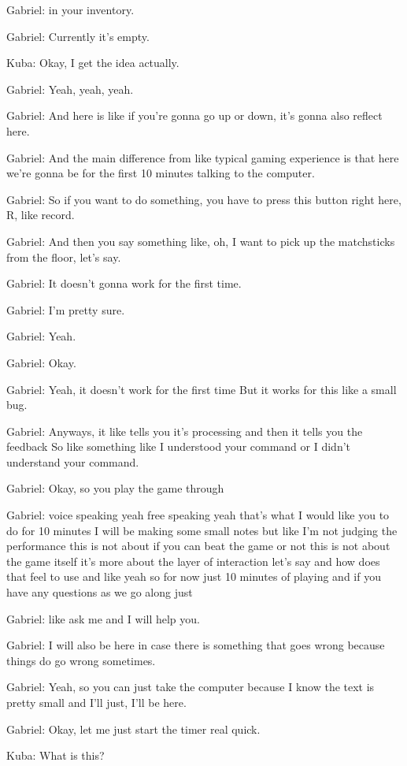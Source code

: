 Gabriel: in your inventory.

Gabriel: Currently it's empty.

Kuba: Okay, I get the idea actually.

Gabriel: Yeah, yeah, yeah.

Gabriel: And here is like if you're gonna go up or down, it's gonna also reflect here.

Gabriel: And the main difference from like typical gaming experience is that here we're gonna be for the first 10 minutes talking to the computer.

Gabriel: So if you want to do something, you have to press this button right here, R, like record.

Gabriel: And then you say something like, oh, I want to pick up the matchsticks from the floor, let's say.

Gabriel: It doesn't gonna work for the first time.

Gabriel: I'm pretty sure.

Gabriel: Yeah.

Gabriel: Okay.

Gabriel: Yeah, it doesn't work for the first time But it works for this like a small bug.

Gabriel: Anyways, it like tells you it's processing and then it tells you the feedback So like something like I understood your command or I didn't understand your command.

Gabriel: Okay, so you play the game through

Gabriel: voice speaking yeah free speaking yeah that's what I would like you to do for 10 minutes I will be making some small notes but like I'm not judging the performance this is not about if you can beat the game or not this is not about the game itself it's more about the layer of interaction let's say and how does that feel to use and like yeah so for now just 10 minutes of playing and if you have any questions as we go along just

Gabriel: like ask me and I will help you.

Gabriel: I will also be here in case there is something that goes wrong because things do go wrong sometimes.

Gabriel: Yeah, so you can just take the computer because I know the text is pretty small and I'll just, I'll be here.

Gabriel: Okay, let me just start the timer real quick.

Kuba: What is this?

